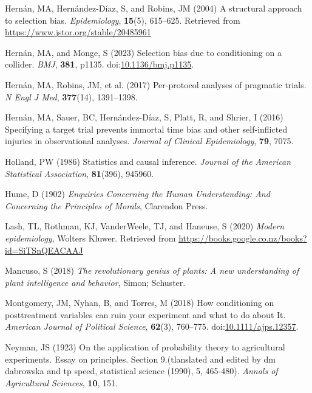 \documentclass[
  singlecolumn]{article}
\newlength{\cslhangindent}
\newenvironment{CSLReferences}[2] %
 {\begin{list}{}{%
  \setlength{\itemindent}{0pt}
  \setlength{\leftmargin}{0pt}
  \setlength{\parsep}{0pt}
  \ifodd #1
   \setlength{\leftmargin}{\cslhangindent}
   \setlength{\itemindent}{-1\cslhangindent}
  \fi
  \setlength{\itemsep}{#2\baselineskip}}}
 {\end{list}}
\begin{document}
\begin{CSLReferences}{1}{0}
Hernán, MA, Hernández-Díaz, S, and Robins, JM (2004) A structural
approach to selection bias. \emph{Epidemiology}, \textbf{15}(5),
615--625. Retrieved from \url{https://www.jstor.org/stable/20485961}

Hernán, MA, and Monge, S (2023) Selection bias due to conditioning on a
collider. \emph{BMJ}, \textbf{381}, p1135.
doi:\href{https://doi.org/10.1136/bmj.p1135}{10.1136/bmj.p1135}.

Hernán, MA, Robins, JM, et al. (2017) Per-protocol analyses of pragmatic
trials. \emph{N Engl J Med}, \textbf{377}(14), 1391--1398.

Hernán, MA, Sauer, BC, Hernández-Díaz, S, Platt, R, and Shrier, I (2016)
Specifying a target trial prevents immortal time bias and other
self-inflicted injuries in observational analyses. \emph{Journal of
Clinical Epidemiology}, \textbf{79}, 7075.

Holland, PW (1986) Statistics and causal inference. \emph{Journal of the
American Statistical Association}, \textbf{81}(396), 945960.

Hume, D (1902) \emph{Enquiries Concerning the Human Understanding: And
Concerning the Principles of Morals}, Clarendon Press.

Lash, TL, Rothman, KJ, VanderWeele, TJ, and Haneuse, S (2020)
\emph{Modern epidemiology}, Wolters Kluwer. Retrieved from
\url{https://books.google.co.nz/books?id=SiTSnQEACAAJ}

Mancuso, S (2018) \emph{The revolutionary genius of plants: A new
understanding of plant intelligence and behavior}, Simon; Schuster.

Montgomery, JM, Nyhan, B, and Torres, M (2018) How conditioning on
posttreatment variables can ruin your experiment and what to do about
It. \emph{American Journal of Political Science}, \textbf{62}(3),
760--775.
doi:\href{https://doi.org/10.1111/ajps.12357}{10.1111/ajps.12357}.

Neyman, JS (1923) On the application of probability theory to
agricultural experiments. Essay on principles. Section 9.(tlanslated and
edited by dm dabrowska and tp speed, statistical science (1990), 5,
465-480). \emph{Annals of Agricultural Sciences}, \textbf{10}, 151.


\end{CSLReferences}
\end{document}
